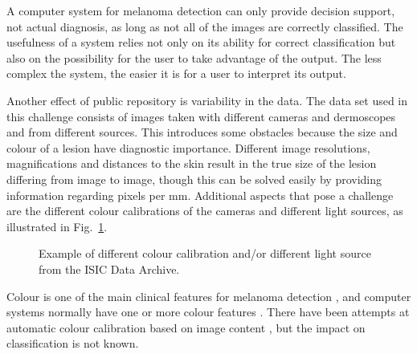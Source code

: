 \documentclass[a4paper,12pt]{article}
\begin{document}
 
A computer system for melanoma detection can only provide decision support, not actual diagnosis, as long as not all of the images are correctly classified. The usefulness of a system relies not only on its ability for correct classification but also on the possibility for the user to take advantage of the output. The less complex the system, the easier it is for a user to interpret its output. 





Another effect of public repository is variability in the data. 
The data set used in this challenge consists of images taken with different cameras and dermoscopes and from different sources. This  introduces some obstacles because the size and colour of a lesion have diagnostic importance. Different image resolutions, magnifications and distances to the skin result in the true size of the lesion differing from image to image, though this can be solved easily by providing information regarding pixels per mm. Additional aspects that pose a challenge are the different colour calibrations of the cameras and different light sources, as illustrated in  Fig.~\ref{fig:Colour}. 
  \begin{figure}[h!]
  \centering
        \caption{Example of different colour calibration and/or different light source from the ISIC Data Archive.}
        \label{fig:Colour}
   \end{figure}
Colour is one of the main clinical features for melanoma detection \citep{Argenziano2003Dermoscopy}, and computer systems normally have one or more colour features \citep{Korotkov2012Computerized}. There have been attempts at automatic colour calibration based on image content \citep{Iyatomi2011Automated}, but the impact on classification is not known. 
\end{document}
